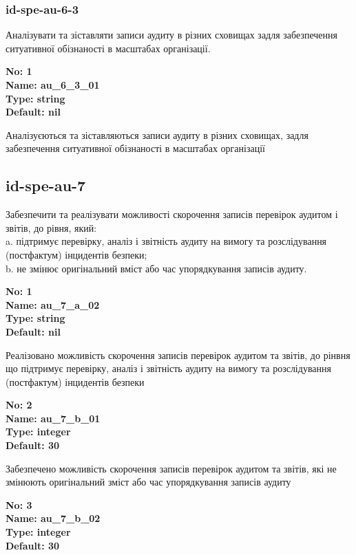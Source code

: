 \documentclass{article}
\begin{document}
\subsubsection{id-spe-au-6-3}
Аналізувати та зіставляти записи аудиту в різних сховищах задля забезпечення ситуативної обізнаності в масштабах організації.

\vspace{10pt}
{\footnotesize\bfseries
No: 1\\
Name: au\_\allowbreak{}6\_\allowbreak{}3\_\allowbreak{}01\\
Type: string\\
Default: nil
}

{\footnotesize Аналізуєються та зіставляються записи аудиту в різних сховищах, задля забезпечення ситуативної обізнаності в масштабах організації}




\subsection{id-spe-au-7}
Забезпечити та реалізувати можливості скорочення записів перевірок аудитом і звітів, до рівня, який:\\ 
a. підтримує перевірку, аналіз і звітність аудиту на вимогу та розслідування (постфактум) інцидентів безпеки;\\ 
b. не змінює оригінальний вміст або час упорядкування записів аудиту.

\vspace{10pt}
{\footnotesize\bfseries
No: 1\\
Name: au\_\allowbreak{}7\_\allowbreak{}a\_\allowbreak{}02\\
Type: string\\
Default: nil
}

{\footnotesize Реалізовано можливість скорочення записів перевірок аудитом та звітів, до рінвня що підтримує перевірку, аналіз і звітність аудиту на вимогу та розслідування (постфактум) інцидентів безпеки}


{\footnotesize\bfseries
No: 2\\
Name: au\_\allowbreak{}7\_\allowbreak{}b\_\allowbreak{}01\\
Type: integer\\
Default: 30
}

{\footnotesize Забезпечено можливість скорочення записів перевірок аудитом та звітів, які не змінюють оригінальний зміст або час упорядкування записів аудиту}


{\footnotesize\bfseries
No: 3\\
Name: au\_\allowbreak{}7\_\allowbreak{}b\_\allowbreak{}02\\
Type: integer\\
Default: 30
}
\end{document}
